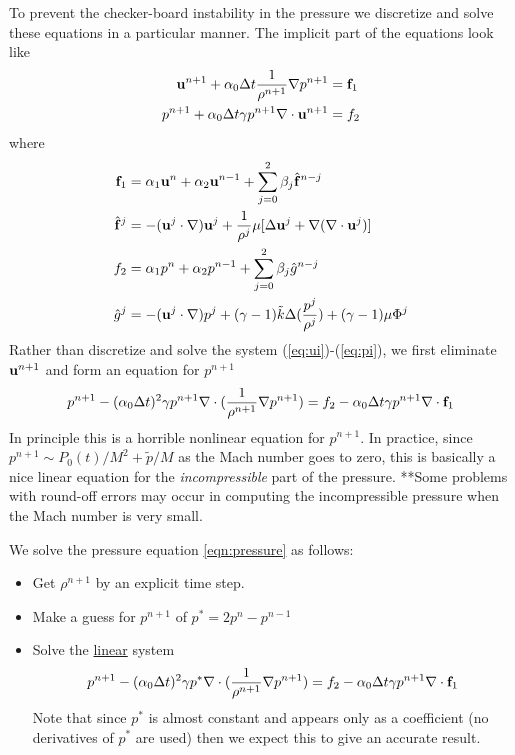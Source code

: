 \documentclass[10pt]{article}
\begin{document}
\newcommand{\dx}{{\Delta x}}
\newcommand{\pf}{\tilde{p}}   
To prevent the checker-board instability in the pressure we discretize and solve these
equations in a particular manner. The implicit part of the equations look like
\begin{align}
   {\bf u}^{n+1} + \alpha_0 {\Delta t} {1\over\rho^{n+1}}\nabla p^{n+1} &= {\bf f}_1  \label{eq:ui} \\
   p^{n+1} + \alpha_0 {\Delta t} \gamma p^{n+1} \nabla\cdot{\bf u}^{n+1} &= f_2   \label{eq:pi}
\end{align}
where
\begin{align}
  {\bf f}_1 & = \alpha_1 {\bf u}^{n} + \alpha_2 {\bf u}^{n-1} + \sum_{j=0}^2 \beta_j \hat{{\bf f}}^{n-j} \\
  \hat{{\bf f}}^{j} &= -({\bf u}^j \cdot\nabla){\bf u}^j  + {1\over\rho^j } \mu [\Delta {\bf u}^j  + \nabla(\nabla\cdot{\bf u}^j ) ] \\
  f_2 &= \alpha_1 p^{n} + \alpha_2 p^{n-1} + \sum_{j=0}^2 \beta_j \hat{g}^{n-j} \\
  \hat{g}^j &= -({\bf u}^j\cdot\nabla) p^j + (\gamma-1)\tilde{k} \Delta({p^j\over \rho^j}) +(\gamma-1)\mu \Phi^j
\end{align}
Rather than discretize and solve the system (\ref{eq:ui})-(\ref{eq:pi}), we first eliminate ${\bf u}^{n+1}$ and
form an equation for $p^{n+1}$
\begin{equation} \label{eqn:pressure}
   p^{n+1} - (\alpha_0{\Delta t})^2 \gamma p^{n+1} \nabla\cdot( {1\over\rho^{n+1}}\nabla p^{n+1} ) 
          = f_2 -   \alpha_0{\Delta t} \gamma p^{n+1} \nabla\cdot{\bf f}_1
\end{equation}
In principle this is a horrible nonlinear equation for $p^{n+1}$. In practice, since
$p^{n+1} \sim P_0(t)/M^2 + \pf/M$ as the Mach number goes to zero, this is basically
a nice linear equation for the {\sl incompressible} part of the pressure.
**Some problems with round-off errors may occur in computing the incompressible
pressure when the Mach number is very small.

We solve the pressure equation \ref{eqn:pressure} as follows:
\begin{itemize}
  \item Get $\rho^{n+1}$ by an explicit time step.
  \item Make a guess for $p^{n+1}$ of $p^* = 2 p^n - p^{n-1}$
  \item Solve the \underline{linear} system
\begin{equation} \label{eqn:pressure2}
   p^{n+1} - (\alpha_0{\Delta t})^2 \gamma p^* \nabla\cdot( {1\over\rho^{n+1}}\nabla p^{n+1} ) 
          = f_2 -   \alpha_0{\Delta t} \gamma p^{n+1} \nabla\cdot{\bf f}_1
\end{equation}
    Note that since $p^*$ is almost constant and appears only as a coefficient (no derivatives
    of $p^*$ are used) then we expect this to give an accurate result.
\end{itemize}
\end{document}
